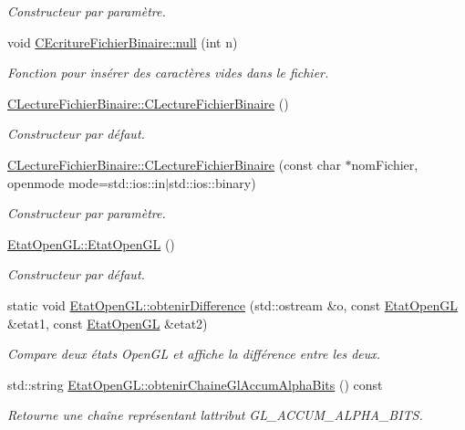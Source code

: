 \begin{DoxyCompactItemize}
\begin{DoxyCompactList}\small\item\em Constructeur par paramètre. \end{DoxyCompactList}\item 
void \hyperlink{group__utilitaire_ga7145545254c30909311d3b1ef0bdd07a}{C\+Ecriture\+Fichier\+Binaire\+::null} (int n)
\begin{DoxyCompactList}\small\item\em Fonction pour insérer des caractères vides dans le fichier. \end{DoxyCompactList}\item 
\hyperlink{group__utilitaire_ga3a259905a2c14513846e6ecb8cf476ad}{C\+Lecture\+Fichier\+Binaire\+::\+C\+Lecture\+Fichier\+Binaire} ()
\begin{DoxyCompactList}\small\item\em Constructeur par défaut. \end{DoxyCompactList}\item 
\hyperlink{group__utilitaire_gac16ebab7b172408c2ba14605f61f0f84}{C\+Lecture\+Fichier\+Binaire\+::\+C\+Lecture\+Fichier\+Binaire} (const char $\ast$nom\+Fichier, openmode mode=std\+::ios\+::in$\vert$std\+::ios\+::binary)
\begin{DoxyCompactList}\small\item\em Constructeur par paramètre. \end{DoxyCompactList}\item 
\hyperlink{group__utilitaire_gaf682f61929f2502b08b6b88de07349b6}{Etat\+Open\+G\+L\+::\+Etat\+Open\+G\+L} ()
\begin{DoxyCompactList}\small\item\em Constructeur par défaut. \end{DoxyCompactList}\item 
static void \hyperlink{group__utilitaire_ga24ddfdab3e65cc4069b86ba84d3f565b}{Etat\+Open\+G\+L\+::obtenir\+Difference} (std\+::ostream \&o, const \hyperlink{class_etat_open_g_l}{Etat\+Open\+G\+L} \&etat1, const \hyperlink{class_etat_open_g_l}{Etat\+Open\+G\+L} \&etat2)
\begin{DoxyCompactList}\small\item\em Compare deux états Open\+G\+L et affiche la différence entre les deux. \end{DoxyCompactList}\item 
std\+::string \hyperlink{group__utilitaire_ga13c8aaca9f02431b47b83e36b18f8067}{Etat\+Open\+G\+L\+::obtenir\+Chaine\+Gl\+Accum\+Alpha\+Bits} () const 
\begin{DoxyCompactList}\small\item\em Retourne une chaîne représentant l\textquotesingle{}attribut G\+L\+\_\+\+A\+C\+C\+U\+M\+\_\+\+A\+L\+P\+H\+A\+\_\+\+B\+I\+T\+S. \end{DoxyCompactList}\item 

\end{DoxyCompactItemize}
